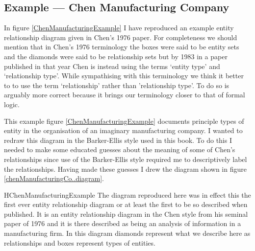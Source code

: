 \subsection{Example --- Chen Manufacturing Company}
\label{ChenManufacturingCompany}
In figure \ref{ChenManufacturingExample} I have reproduced an example entity relationship diagram  given in Chen's 1976 paper. For completeness we should mention that in Chen's 1976 terminology the boxes were said to be entity sets and the diamonds were said to be relationship sets but by 1983 in a paper published in that year Chen is instead using the terms `entity type' and `relationship type'. While sympathising with this terminology we think it better to to use the term `relationship' rather than 'relationship type'. To do so is arguably more correct because it brings our terminology closer to that of formal logic.

\mynote
This example figure \ref{ChenManufacturingExample} documents principle types of entity in the organisation of an imaginary manufacturing company.  I wanted to redraw
this diagram in the Barker-Ellis style used in this book. To do this I needed to make some educated guesses about the meaning of some of Chen's relationships since use of the Barker-Ellis style  required me to descriptively label the relationships. Having made these guesses I drew the diagram shown
 in figure \ref{chenManufacturingCo..diagram}. 

\begin{erboxedFigure} {H}{ChenManufacturingExample}{
The diagram reproduced here was in effect this the first ever entity relationship diagram or at least the first to be so described when published. 
It is an entity relationship diagram in the Chen style from his seminal paper of 1976 and it is there described as being an analysis of information in a manufacturing firm. In this diagram
diamonds represent what we describe here as relationships and boxes represent types of entities.  
}
\begin{center}
\scalebox{0.80}{}
\end{center}
\end{erboxedFigure}

